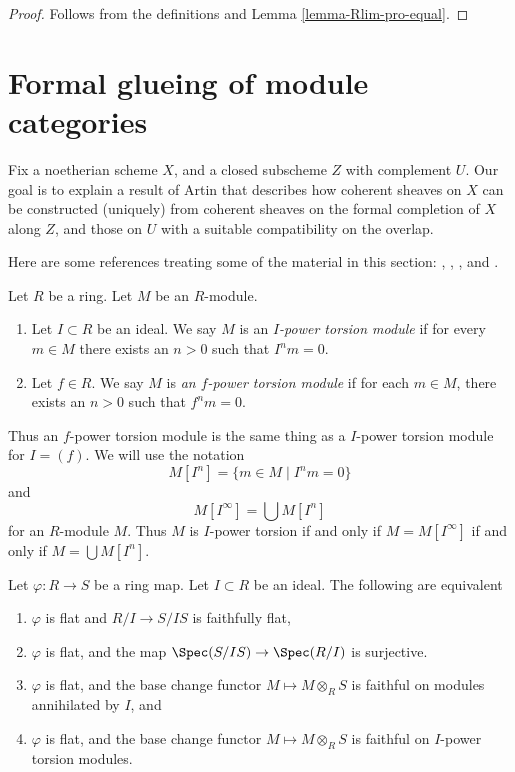 \begin{proof}
Follows from the definitions and Lemma \ref{lemma-Rlim-pro-equal}.
\end{proof}










\section{Formal glueing of module categories}
\label{section-formal-glueing}

\noindent
Fix a noetherian scheme $X$, and a closed subscheme $Z$ with complement $U$.
Our goal is to explain a result of Artin that describes how coherent sheaves on
$X$ can be constructed (uniquely) from coherent sheaves on the formal
completion of $X$ along $Z$, and those on $U$ with a suitable compatibility on
the overlap.

\medskip\noindent
Here are some references treating some of the material in this section:
\cite[Section 2]{ArtinII},
\cite[Appendix]{Ferrand-Raynaud},
\cite{MB}, and
\cite[Section 4.6]{dJ-crystalline}.

\begin{definition}
\label{definition-f-power-torsion}
Let $R$ be a ring. Let $M$ be an $R$-module.
\begin{enumerate}
\item Let $I \subset R$ be an ideal. We say $M$ is an
{\it $I$-power torsion module} if for every $m \in M$ there exists an $n > 0$
such that $I^n m = 0$.
\item Let $f \in R$. We say $M$ is
{\it an $f$-power torsion module} if for each
$m \in M$, there exists an $n > 0$ such that $f^n m = 0$.
\end{enumerate}
\end{definition}

\noindent
Thus an $f$-power torsion module is the same thing as a $I$-power torsion
module for $I = (f)$. We will use the notation
$$
M[I^n] = \{m \in M \mid I^nm = 0\}
$$
and
$$
M[I^\infty] = \bigcup M[I^n]
$$
for an $R$-module $M$. Thus $M$ is $I$-power torsion if and only if
$M = M[I^\infty]$ if and only if $M = \bigcup M[I^n]$.

\begin{lemma}
\label{lemma-characterize-flatness-on-torsion}
Let $\varphi : R \to S$ be a ring map. Let $I \subset R$ be an ideal.
The following are equivalent
\begin{enumerate}
\item $\varphi$ is flat and $R/I \to S/IS$ is faithfully flat,
\item $\varphi$ is flat, and the map
$\Spec(S/IS) \to \Spec(R/I)$ is surjective.
\item $\varphi$ is flat, and the base change functor
$M \mapsto M \otimes_R S$ is faithful on modules annihilated by $I$, and
\item $\varphi$ is flat, and the base change functor
$M \mapsto M \otimes_R S$ is faithful on $I$-power torsion modules.
\end{enumerate}
\end{lemma}

